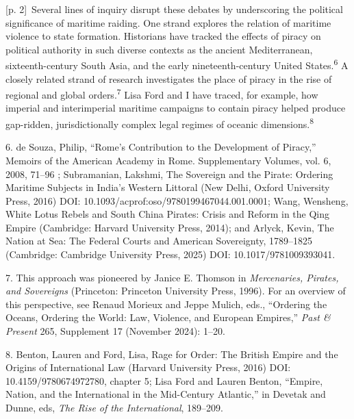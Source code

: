 \documentclass[10pt,a4paper]{article}
\begin{document}
{\scriptsize\color{gray} [p. 2]}\ Several lines of inquiry disrupt these debates by underscoring the political significance of maritime raiding. One strand explores the relation of maritime violence to state formation. Historians have tracked the effects of piracy on political authority in such diverse contexts as the ancient Mediterranean, sixteenth-century South Asia, and the early nineteenth-century United States.\nobreak\textsuperscript{6} A closely related strand of research investigates the place of piracy in the rise of regional and global orders.\nobreak\textsuperscript{7} Lisa Ford and I have traced, for example, how imperial and interimperial maritime campaigns to contain piracy helped produce gap-ridden, jurisdictionally complex legal regimes of oceanic dimensions.\nobreak\textsuperscript{8}\par{\small 6. de Souza, Philip, “Rome’s Contribution to the Development of Piracy,” Memoirs of the American Academy in Rome. Supplementary Volumes, vol. 6, 2008, 71–96 ; Subramanian, Lakshmi, The Sovereign and the Pirate: Ordering Maritime Subjects in India’s Western Littoral (New Delhi, Oxford University Press, 2016) DOI: 10.1093/acprof:oso/9780199467044.001.0001; Wang, Wensheng, White Lotus Rebels and South China Pirates: Crisis and Reform in the Qing Empire (Cambridge: Harvard University Press, 2014); and Arlyck, Kevin, The Nation at Sea: The Federal Courts and American Sovereignty, 1789–1825 (Cambridge: Cambridge University Press, 2025) DOI: 10.1017/9781009393041.\par}{\small 7. This approach was pioneered by Janice E. Thomson in \textit{Mercenaries, Pirates, and Sovereigns} (Princeton: Princeton University Press, 1996). For an overview of this perspective, see Renaud Morieux and Jeppe Mulich, eds., “Ordering the Oceans, Ordering the World: Law, Violence, and European Empires,” \textit{Past \& Present} 265, Supplement 17 (November 2024): 1–20.\par}{\small 8. Benton, Lauren and Ford, Lisa, Rage for Order: The British Empire and the Origins of International Law (Harvard University Press, 2016) DOI: 10.4159/9780674972780, chapter 5; Lisa Ford and Lauren Benton, “Empire, Nation, and the International in the Mid-Century Atlantic,” in Devetak and Dunne, eds, \textit{The Rise of the International}, 189–209.\par}
\end{document}
